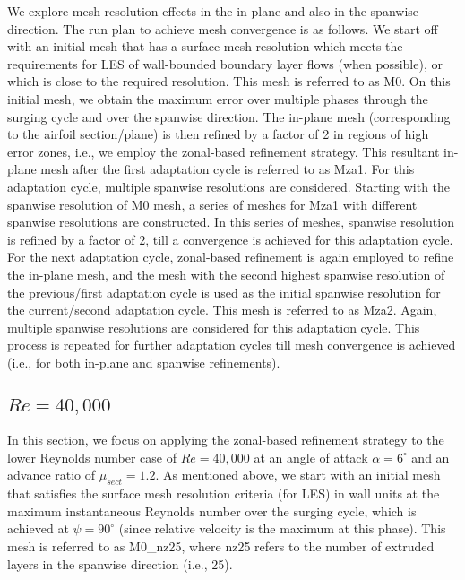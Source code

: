 We explore mesh resolution effects in the in-plane and also in the spanwise direction. 
The run plan to achieve mesh convergence is as follows. 
We start off with an initial mesh that has a surface mesh resolution which meets the requirements for LES of wall-bounded boundary layer flows (when possible), or which is close to the required resolution. This mesh is referred to as M0.
On this initial mesh, we obtain the maximum error over multiple phases through the surging cycle and over the spanwise direction.
The in-plane mesh (corresponding to the airfoil section/plane) is then refined by a factor of 2 in regions of high error zones, i.e., we employ the zonal-based refinement strategy.
This resultant in-plane mesh after the first adaptation cycle is referred to as Mza1.
For this adaptation cycle, multiple spanwise resolutions are considered. Starting with the spanwise resolution of M0 mesh, a series of meshes for Mza1 with different spanwise resolutions are constructed.
In this series of meshes, spanwise resolution is refined by a factor of 2, till a convergence is achieved for this adaptation cycle. 
For the next adaptation cycle, zonal-based refinement is again employed to refine the in-plane mesh, and the mesh with the second highest spanwise resolution of the previous/first adaptation cycle is used as the initial spanwise resolution for the current/second adaptation cycle.
This mesh is referred to as Mza2.
Again, multiple spanwise resolutions are considered for this adaptation cycle.
This process is repeated for further adaptation cycles till mesh convergence is achieved (i.e., for both in-plane and spanwise refinements).

\subsection{ $Re=40,000$}




In this section, we focus on applying the zonal-based refinement strategy to the lower Reynolds number case of $Re=40,000$ at an angle of attack $\alpha=6^\circ$ and an advance ratio of $\mu_{sect}=1.2$.
As mentioned above, we start with an initial mesh that satisfies the surface mesh resolution criteria (for LES) in wall units at the maximum instantaneous Reynolds number over the surging cycle, which is achieved at $\psi=90^\circ$ (since relative velocity is the maximum at this phase). 
This mesh is referred to as M0\_nz25, where nz25 refers to the number of extruded layers in the spanwise direction (i.e., 25).

